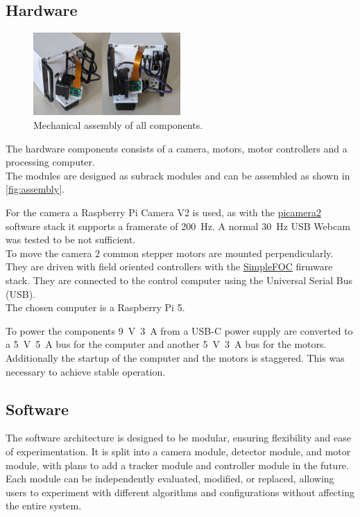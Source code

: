 \documentclass[
    parskip=half, 
    twoside=false,
    twocolumn=true,
    fontsize=12pt,
]{scrarticle}
\begin{document}
\subsection*{Hardware}
\begin{figure}
    \centering
    \includegraphics[width=0.5\textwidth]{../hardware/assembly.png}
    \caption{Mechanical assembly of all components.}
    \label{fig:assembly}
\end{figure}
The hardware components consists of a camera, motors, motor controllers and a processing computer.\\
The modules are designed as subrack modules and can be assembled as shown in \autoref{fig:assembly}.


For the camera a Raspberry Pi Camera V2 is used, as with the \href{https://github.com/raspberrypi/picamera2}{picamera2} software stack it supports a framerate of \SI{200}{Hz}.
A normal \SI{30}{Hz} USB Webcam was tested to be not sufficient.\\
To move the camera 2 common stepper motors are mounted perpendicularly.
They are driven with field oriented controllers with the \href{https://simplefoc.com/}{SimpleFOC} firmware stack.
They are connected to the control computer using the Universal Serial Bus (USB).\\
The chosen computer is a Raspberry Pi 5.

To power the components \SI{9}{V}~\SI{3}{A} from a USB-C power supply are converted to a \SI{5}{V}~\SI{5}{A} bus for the computer and another \SI{5}{V}~\SI{3}{A} bus for the motors.
Additionally the startup of the computer and the motors is staggered.
This was necessary to achieve stable operation.

\subsection*{Software}
The software architecture is designed to be modular, ensuring flexibility and ease of experimentation. It is split into a camera module, detector module, and motor module, with plans to add a tracker module and controller module in the future. Each module can be independently evaluated, modified, or replaced, allowing users to experiment with different algorithms and configurations without affecting the entire system.
\end{document}
